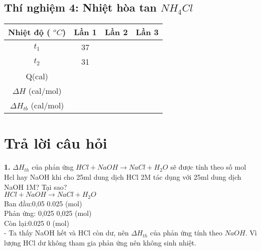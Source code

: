       \subsection{Thí nghiệm 4: Nhiệt hòa tan $NH_{4}Cl$}
      
         \begin{center}
             \begin{tabular}{|c|c|c|c|}
                  \hline Nhiệt độ ( $^{o}C$)&\textbf{Lần 1}&\textbf{Lần 2}&\textbf{Lần 3}\\
                  \hline $t_{1}$&37&&\\
                  \hline $t_{2}$&31&&\\
                  \hline Q(cal)&&&\\
                  \hline $\Delta H$ (cal/mol)&&&\\
                  \hline $\Delta H_{tb}$ (cal/mol)&\multicolumn{3}{c|}{}\\
                  \hline
             \end{tabular}
         \end{center}
         
   \section{Trả lời câu hỏi}
   
   \textbf{1.} $\Delta H_{th}$ của phản ứng $HCl + NaOH \to NaCl + H_{2}O$ sẽ được tính theo số mol Hcl hay NaOH khi cho 25ml dung dịch HCl 2M tác dụng với 25ml dung dịch NaOH 1M? Tại sao?\\
   
   \hspace{2cm} $HCl   +   NaOH \to NaCl + H_{2}O$\\
     Ban đầu:\hspace{1.1cm}0,05 \hspace{0.4cm}0.025 \hspace{3.8cm}(mol)\\
     Phản ứng: \hspace{0.75cm}0,025 \hspace{0.2cm}0,025 \hspace{3.8cm} (mol)\\
     Còn lại:\hspace{1.25cm}0.025 \hspace{0.47cm}0 \hspace{4.25cm} (mol)\\
   
   - Ta thấy NaOH hết và HCl còn dư, nên $\Delta H_{th}$ của phản ứng tính theo $NaOH$. Vì lượng HCl dư không tham gia phản ứng nên không sinh nhiệt.\\
   
